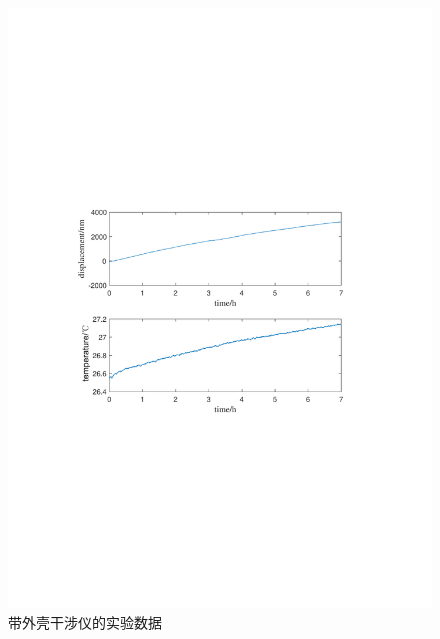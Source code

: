\begin{figure}[htb]
    \centering
    \includegraphics[width=12cm]{fig/3-fig/实验数据-带外壳的干涉仪.pdf}
    \caption{带外壳干涉仪的实验数据}
    \label{fig:带外壳干涉仪的实验数据}
\end{figure}

